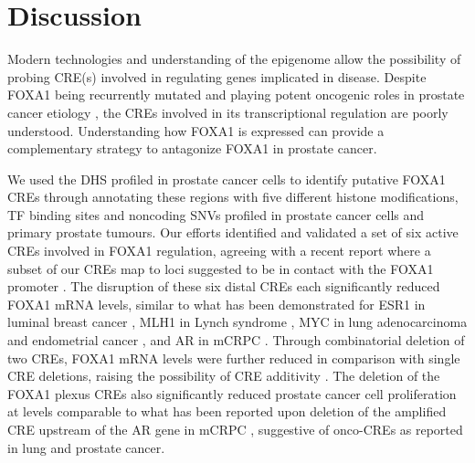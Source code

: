 \section{Discussion}

Modern technologies and understanding of the epigenome allow the possibility of probing CRE(s) involved in regulating genes implicated in disease.
Despite FOXA1 being recurrently mutated \cite{abeshouseMolecularTaxonomyPrimary2015,fraserGenomicHallmarksLocalized2017,barbieriExomeSequencingIdentifies2012,grassoMutationalLandscapeLethal2012,robinsonIntegrativeClinicalGenomics2015} and playing potent oncogenic roles in prostate cancer etiology \cite{paroliaDistinctStructuralClasses2019,adamsFOXA1MutationsAlter2019,gaoForkheadDomainMutations2019}, the CREs involved in its transcriptional regulation are poorly understood.
Understanding how FOXA1 is expressed can provide a complementary strategy to antagonize FOXA1 in prostate cancer.

We used the DHS profiled in prostate cancer cells to identify putative FOXA1 CREs through annotating these regions with five different histone modifications, TF binding sites and noncoding SNVs profiled in prostate cancer cells and primary prostate tumours.
Our efforts identified and validated a set of six active CREs involved in FOXA1 regulation, agreeing with a recent report where a subset of our CREs map to loci suggested to be in contact with the FOXA1 promoter \cite{rhieHighresolution3DEpigenomic2019}.
The disruption of these six distal CREs each significantly reduced FOXA1 mRNA levels, similar to what has been demonstrated for ESR1 in luminal breast cancer \cite{baileyNoncodingSomaticInherited2016}, MLH1 in Lynch syndrome \cite{liuDisruption35Kb2018}, MYC in lung adenocarcinoma and endometrial cancer \cite{zhangIdentificationFocallyAmplified2016}, and AR in mCRPC \cite{takedaSomaticallyAcquiredEnhancer2018,viswanathanStructuralAlterationsDriving2018}.
Through combinatorial deletion of two CREs, FOXA1 mRNA levels were further reduced in comparison with single CRE deletions, raising the possibility of CRE additivity \cite{osterwalderEnhancerRedundancyProvides2018}.
The deletion of the FOXA1 plexus CREs also significantly reduced prostate cancer cell proliferation at levels comparable to what has been reported upon deletion of the amplified CRE upstream of the AR gene in mCRPC \cite{takedaSomaticallyAcquiredEnhancer2018}, suggestive of onco-CREs as reported in lung \cite{zhangIdentificationFocallyAmplified2016} and prostate \cite{takedaSomaticallyAcquiredEnhancer2018} cancer.

